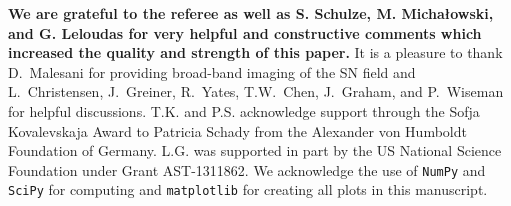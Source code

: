\documentclass[traditabstract, referee]{aa}
\begin{document}
\begin{acknowledgements}

\textbf{We are grateful to the referee as well as S. Schulze, M. {Micha{\l}owski}, and G. Leloudas for very helpful and constructive comments which increased the quality and strength of this paper.} It is a pleasure to thank D.~Malesani for providing broad-band imaging of the SN field and L.~Christensen, J.~Greiner, R.~Yates, T.W.~Chen, J.~Graham, and P.~Wiseman for helpful discussions. T.K. and P.S. acknowledge support through the Sofja Kovalevskaja Award to Patricia Schady from the Alexander von Humboldt Foundation of Germany. L.G. was supported in part by the US National Science Foundation under Grant AST-1311862. We acknowledge the use of \texttt{NumPy} and \texttt{SciPy} \citep{Walt:2011:NAS:1957373.1957466} for computing and \texttt{matplotlib} \citep{Hunter:2007} for creating all plots in this manuscript. 

\end{acknowledgements}



\end{document}
